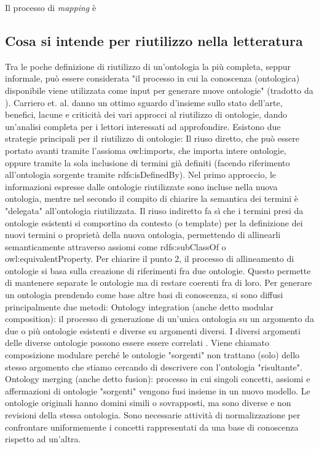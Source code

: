 Il processo di \textit{mapping} è 


\subsection{Cosa si intende per riutilizzo nella letteratura}
Tra le poche definizione di riutilizzo di un'ontologia la più completa, seppur informale, può essere considerata "il processo in cui la conoscenza (ontologica) disponibile viene utilizzata come input per generare nuove ontologie" (tradotto da \cite{...}). Carriero et. al. \cite{...} danno un ottimo sguardo d'insieme sullo stato dell'arte, benefici, lacune e criticità dei vari approcci al riutilizzo di ontologie, dando un'analisi completa per i lettori interessati ad approfondire.
Esistono due strategie principali per il riutilizzo di ontologie: 
Il riuso diretto, che può essere portato avanti tramite l'assioma owl:imports, che importa intere ontologie, oppure tramite la sola inclusione di termini già definiti (facendo riferimento all'ontologia sorgente tramite rdfs:isDefinedBy). Nel primo approccio, le informazioni espresse dalle ontologie riutilizzate sono incluse nella nuova ontologia, mentre nel secondo il compito di chiarire la semantica dei termini è "delegata" all'ontologia riutilizzata.
Il riuso indiretto fa sì che i termini presi da ontologie esistenti si comportino da contesto (o template) per la definizione dei nuovi termini o proprietà della nuova ontologia, permettendo di allinearli semanticamente attraverso assiomi come rdfs:subClassOf o owl:equivalentProperty.
Per chiarire il punto 2, il processo di allineamento di ontologie si basa sulla creazione di riferimenti fra due ontologie. Questo permette di mantenere separate le ontologie ma di restare coerenti fra di loro. \cite{...}
Per generare un ontologia prendendo come base altre basi di conoscenza, si sono diffusi principalmente due metodi:
Ontology integration (anche detto modular composition): il processo di generazione di un'unica ontologia su un argomento da due o più ontologie esistenti e diverse su argomenti diversi. I diversi argomenti delle diverse ontologie possono essere essere correlati \cite{...}. Viene chiamato composizione modulare perché le ontologie "sorgenti" non trattano (solo) dello stesso argomento che stiamo cercando di descrivere con l'ontologia "risultante".
Ontology merging (anche detto fusion): processo in cui singoli concetti, assiomi e affermazioni di ontologie "sorgenti" vengono fusi insieme in un nuovo modello. Le ontologie originali hanno domini simili o sovrapposti, ma sono diverse e non revisioni della stessa ontologia. Sono necessarie attività di normalizzazione per confrontare uniformemente i concetti rappresentati da una base di conoscenza rispetto ad un'altra. \cite{.., ..}
